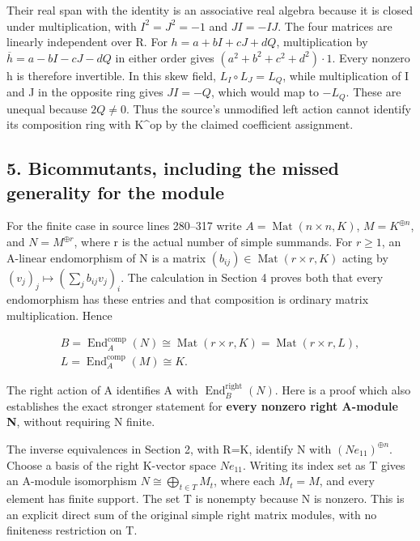 Their real span with the identity is an associative real algebra because it is closed under multiplication, with \(I^{2}=J^{2}=-1\) and \(JI=-IJ\). The four matrices are linearly independent over R. For \(h=a+bI+cJ+dQ\), multiplication by \(\overline{h}=a-bI-cJ-dQ\) in either order gives \((a^{2}+b^{2}+c^{2}+d^{2})\cdot 1\). Every nonzero h is therefore invertible. In this skew field, \(L_{I}\circ L_{J}=L_{Q}\), while multiplication of I and J in the opposite ring gives \(JI=-Q\), which would map to \(-L_{Q}\). These are unequal because \(2Q\ne 0\). Thus the source's unmodified left action cannot identify its composition ring with K\^{}op by the claimed coefficient assignment.

\subsection{5. Bicommutants, including the missed generality for the module}\label{bicommutants-including-the-missed-generality-for-the-module}

For the finite case in source lines 280--317 write \(A=\operatorname{Mat}(n\times n,K)\), \(M=K^{\oplus n}\), and \(N=M^{\oplus r}\), where r is the actual number of simple summands. For \(r\geq 1\), an A-linear endomorphism of N is a matrix \((b_{ij})\in \operatorname{Mat}(r\times r,K)\) acting by \((v_{j})_{j}\mapsto (\sum _{j} b_{ij} v_{j})_{i}\). The calculation in Section 4 proves both that every endomorphism has these entries and that composition is ordinary matrix multiplication. Hence

\[\begin{gathered}
B=\operatorname{End}_{A}^{\mathrm{comp}}(N) \cong \operatorname{Mat}(r\times r,K)=\operatorname{Mat}(r\times r,L),\\L=\operatorname{End}_{A}^{\mathrm{comp}}(M)\cong K.
\end{gathered}\]

The right action of A identifies A with \(\operatorname{End}_{B}^{\mathrm{right}}(N)\). Here is a proof which also establishes the exact stronger statement for \textbf{every nonzero right A-module N}, without requiring N finite.

The inverse equivalences in Section 2, with R=K, identify N with \((N e_{11})^{\oplus n}\). Choose a basis of the right K-vector space \(N e_{11}\). Writing its index set as T gives an A-module isomorphism \(N\cong \bigoplus _{t\in T} M_{t}\), where each \(M_{t}=M\), and every element has finite support. The set T is nonempty because N is nonzero. This is an explicit direct sum of the original simple right matrix modules, with no finiteness restriction on T.


